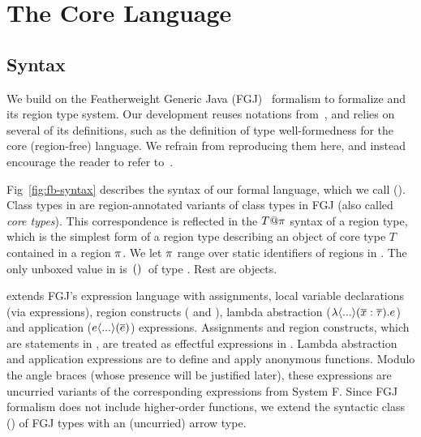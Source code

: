 \section{The Core Language}
\label{sec:type-system}



\subsection{Syntax}
\label{sec:fb-syntax}

We build on the Featherweight Generic Java (FGJ)~\cite{fgj} formalism
to formalize \name and its region type system. Our development reuses
notations from~\cite{fgj}, and relies on several of its definitions,
such as the definition of type well-formedness for the core
(region-free) language. We refrain from reproducing them here, and
instead encourage the reader to refer to~\cite{fgj,techrep}.

Fig~\ref{fig:fb-syntax} describes the syntax of our formal language,
which we call \fbname (\FB). Class types in \FB are region-annotated
variants of class types in FGJ (also called \emph{core types}). This
correspondence is reflected in the $T@\pi$ syntax of a region type,
which is the simplest form of a region type describing an object of
core type $T$ contained in a region $\pi$. We let $\pi$ range over
static identifiers of regions in \FB. The only unboxed value in \FB is
$\,{\tt ()}\,$ of type \unitZ. Rest are objects.

\FB extends FGJ's expression language with assignments, local variable
declarations (via  expressions), region constructs
( and ), lambda abstraction
($\lambda\langle ... \rangle(\overline{x} : \overline{\tau}). e$) and application
($e\langle ... \rangle(\overline{e})$) expressions. Assignments and region
constructs, which are statements in \name, are treated as effectful
expressions in \FB. Lambda abstraction and application expressions are
to define and apply anonymous functions. Modulo the angle braces
(whose presence will be justified later), these expressions are
uncurried variants of the corresponding expressions from System F.
Since FGJ formalism does not include higher-order functions, we extend
the syntactic class () of FGJ types with an (uncurried) arrow
type.

